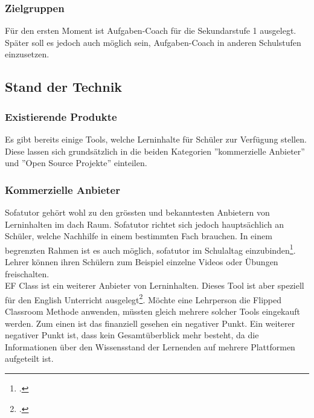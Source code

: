 \subsubsection{Zielgruppen}
Für den ersten Moment ist Aufgaben-Coach für die Sekundarstufe 1 ausgelegt. Später soll es jedoch auch möglich sein, Aufgaben-Coach in anderen Schulstufen einzusetzen.

\subsection{Stand der Technik}
\subsubsection{Existierende Produkte}
Es gibt bereits einige Tools, welche Lerninhalte für Schüler zur Verfügung stellen. Diese lassen sich grundsätzlich in die beiden Kategorien ''kommerzielle Anbieter'' und ''Open Source Projekte'' einteilen.

\subsubsection*{Kommerzielle Anbieter}
Sofatutor gehört wohl zu den grössten und bekanntesten Anbietern von Lerninhalten im \gls{dach} Raum. Sofatutor richtet sich jedoch hauptsächlich an Schüler, welche Nachhilfe in einem bestimmten Fach brauchen. In einem begrenzten Rahmen ist es auch möglich, sofatutor im Schulaltag einzubinden\footcite{sofatutor_fuer_lehrer}. Lehrer können ihren Schülern zum Beispiel einzelne Videos oder Übungen freischalten. \\

EF Class ist ein weiterer Anbieter von Lerninhalten. Dieses Tool ist aber speziell für den English Unterricht ausgelegt\footcite{ef_class_homepage}. Möchte eine Lehrperson die Flipped Classroom Methode anwenden, müssten gleich mehrere solcher Tools eingekauft werden. Zum einen ist das finanziell gesehen ein negativer Punkt. Ein weiterer negativer Punkt ist, dass kein Gesamtüberblick mehr besteht, da die Informationen über den Wissensstand der Lernenden auf mehrere Plattformen aufgeteilt ist.


